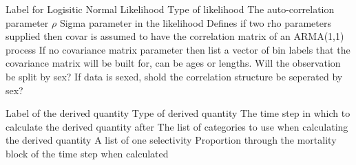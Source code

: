 \par\par
\par\textbf{}\par
\par\textbf{}\par
\par\textbf{}\par
\par\textbf{}\par
\par\textbf{}\par
\par\textbf{}\par
{} {Label for Logisitic Normal Likelihood}
 {Type of likelihood}
 {The auto-correlation parameter $\rho$}
 {Sigma parameter in the likelihood}
 {Defines if two rho parameters supplied then covar is assumed to have the correlation matrix of an ARMA(1,1) process}
 {If no covariance matrix parameter then list a vector of bin labels that the covariance matrix will be built for, can be ages or lengths.}
 {Will the observation be split by sex?}
 {If data is sexed, shold the correlation structure be seperated by sex?}
\par\textbf{}\par
\par\textbf{}\par
\par\textbf{}\par
{}\par\par
{} {Label of the derived quantity}
 {Type of derived quantity}
 {The time step in which to calculate the derived quantity after}
 {The list of categories to use when calculating the derived quantity}
 {A list of one selectivity}
 {Proportion through the mortality block of the time step when calculated}
